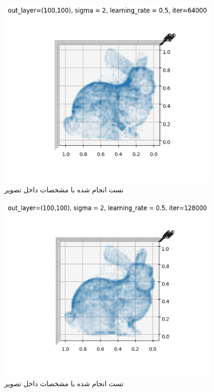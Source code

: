 \documentclass{article}
\begin{document}
\begin{figure}[!h]
    \centering\includegraphics[scale=.65]{./p1-16}
    \caption{تست انجام شده با مشخصات داخل تصویر}\label{fig.116}
\end{figure}

\begin{figure}[!h]
    \centering\includegraphics[scale=.65]{./p1-17}
    \caption{تست انجام شده با مشخصات داخل تصویر}\label{fig.117}
\end{figure}
\end{document}
